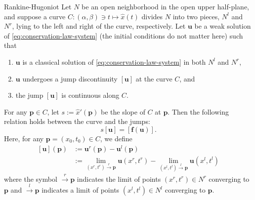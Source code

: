 \begin{Theorem}{Rankine-Hugoniot}
\label{thm:rankine-hugoniot}
Let $N$ be an open neighborhood in the open upper half-plane, and suppose a curve $C:(\alpha,\beta)\ni t\mapsto\hat x(t)$ divides $N$ into two pieces, $N^l$ and $N^r$, lying to the left and right of the curve, respectively. Let $\bm{u}$ be a weak solution of \eqref{eq:conservation-law-system} (the initial conditions do not matter here) such that
\begin{enumerate}
\item $\bm{u}$ is a classical solution of \eqref{eq:conservation-law-system} in both $N^l$ and $N^r$,
\item $\bm{u}$ undergoes a jump discontinuity $[\bm{u}]$ at the curve $C$, and
\item the jump $[\bm{u}]$ is continuous along $C$.
\end{enumerate}
For any $\bm{p}\in C$, let $s:=\hat x'(\bm{p})$ be the slope of $C$ at $\bm{p}$. Then the following relation holds between the curve and the jumps:
\begin{equation}\label{eq:rankine-hugoniot-jump-condition}
s[\bm{u}]=[\bm{f}(\bm{u})].
\end{equation}
Here, for any $\bm{p}=(x_0,t_0)\in C$, we define
\begin{equation}\label{eq:conservation-jump-definition}
\begin{aligned}
[\bm{u}](\bm{p})&:=\bm{u}^r(\bm{p})-\bm{u}^l(\bm{p})\\
&:=\lim_{(x^r,t^r)\xrightarrow{r}\bm{p}}\bm{u}(x^r,t^r)-\lim_{(x^l,t^l)\xrightarrow{l}\bm{p}}\bm{u}(x^l,t^l)
\end{aligned}
\end{equation}
where the symbol $\xrightarrow{r}\bm{p}$ indicates the limit of points $(x^r,t^r)\in N^r$ converging to $\bm{p}$ and $\xrightarrow{l}\bm{p}$ indicates a limit of points $(x^l,t^l)\in N^l$ converging to $\bm{p}$.
\end{Theorem}

